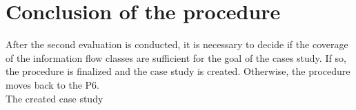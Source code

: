 \section{Conclusion of the procedure}
After the second evaluation is conducted, it is necessary to decide if the coverage of the information flow classes are sufficient for the goal of the cases study. If so, the procedure is finalized and the case study is created. Otherwise, the procedure moves back to the P6.\\ The created case study
%
%
